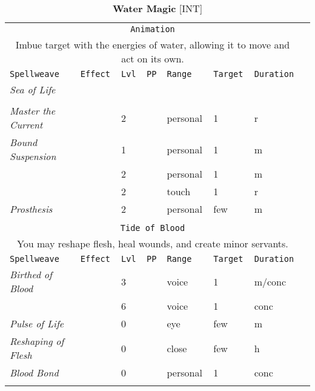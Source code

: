 \documentclass[10pt,a4paper]{article}
\begin{document}
\newpage
\begin{table}[htbp!]
\caption*{\textbf{\Large{Water Magic}} [INT]}
\begin{tabular}{llllllll}
   \multicolumn{7}{c}{\texttt{Animation}}\\
  \multicolumn{7}{c}{Imbue target with the energies of water, allowing it to move and act on its own.}\\
    \hline
 \texttt{Spellweave} & \texttt{Effect} & \texttt{Lvl} & \texttt{PP} & \texttt{Range} & \texttt{Target} & \texttt{Duration} \\
    \hline
    \multirow{1}{*}{\textit{Sea of Life}} &  &  &&  &  & \\
										        &  &  &&  &  & \\
    \hline
    \multirow{1}{*}{\textit{Master the Current}}&  & 2 && personal & 1 & r\\
    \hline
    \multirow{1}{*}{\textit{Bound Suspension}}& & 1 && personal & 1 & m\\ 
									     &  & 2 && personal & 1 & m\\ 
									     &  & 2 && touch & 1 & r\\ 
    \hline
    \multirow{1}{*}{\textit{Prosthesis}}&  & 2 && personal & few & m\\
   &&&&&&\\
   
   
   \multicolumn{7}{c}{\texttt{Tide of Blood}}\\
  \multicolumn{7}{c}{You may reshape flesh, heal wounds, and create minor servants.}\\
    \hline
 \texttt{Spellweave} & \texttt{Effect} & \texttt{Lvl} & \texttt{PP} & \texttt{Range} & \texttt{Target} & \texttt{Duration} \\
    \hline
    \multirow{1}{*}{\textit{Birthed of Blood}} &  & 3 && voice & 1 & m/conc\\
										      &  & 6 && voice & 1 & conc\\
   \hline
    \multirow{1}{*}{\textit{Pulse of Life}} &  & 0 && eye & few & m\\
    \hline
    \multirow{1}{*}{\textit{Reshaping of Flesh}} &  & 0 && close & few & h\\
    \hline
    \multirow{1}{*}{\textit{Blood Bond}} &  & 0 && personal & 1 & conc\\
    &&&&&&\\
   

\end{tabular}
\end{table}
\end{document}
